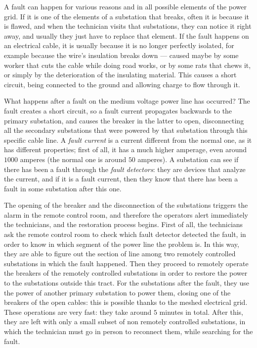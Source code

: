 A fault can happen for various reasons and in all possible elements of the power grid. If it is one of the elements of a substation that breaks, often it is because it is flawed, and when the technician visits that substations, they can notice it right away, and usually they just have to replace that element. If the fault happens on an electrical cable, it is usually because it is no longer perfectly isolated, for example because the wire's insulation breaks down --- caused maybe by some worker that cuts the cable while doing road works, or by some rats that chews it, or simply by the deterioration of the insulating material. This causes a short circuit, being connected to the ground and allowing charge to flow through it.

What happens after a fault on the medium voltage power line has occurred? The fault creates a short circuit, so a fault current propagates backwards to the primary substation, and causes the breaker in the latter to open, disconnecting all the secondary substations that were powered by that substation through this specific cable line. A \emph{fault current} is a current different from the normal one, as it has different properties; first of all, it has a much higher amperage, even around $1000$ amperes (the normal one is around $50$ amperes). A substation can see if there has been a fault through the \emph{fault detectors}: they are devices that analyze the current, and if it is a fault current, then they know that there has been a fault in some substation after this one.

The opening of the breaker and the disconnection of the substations triggers the alarm in the remote control room, and therefore the operators alert immediately the technicians, and the restoration process begins. First of all, the technicians ask the remote control room to check which fault detector detected the fault, in order to know in which segment of the power line the problem is. In this way, they are able to figure out the section of line among two remotely controlled substations in which the fault happened. Then they proceed to remotely operate the breakers of the remotely controlled substations in order to restore the power to the substations outside this tract. For the substations after the fault, they use the power of another primary substation to power them, closing one of the breakers of the open cables: this is possible thanks to the meshed electrical grid. These operations are very fast: they take around $5$ minutes in total. After this, they are left with only a small subset of non remotely controlled substations, in which the technician must go in person to reconnect them, while searching for the fault.

